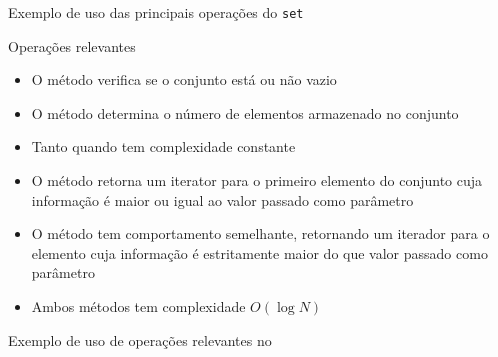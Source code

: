 \begin{frame}[fragile]{Exemplo de uso das principais operações do \texttt{set}}
\end{frame}

\begin{frame}[fragile]{Operações relevantes}

    \begin{itemize}
        \item O método  verifica se o conjunto está ou não vazio

        \item O método  determina o número de elementos armazenado no conjunto

        \item Tanto  quando  tem complexidade constante

        \item O método  retorna um iterator para o primeiro elemento do
            conjunto cuja informação é maior ou igual ao valor passado como parâmetro

        \item O método  tem comportamento semelhante, retornando um iterador
            para o elemento cuja informação é estritamente maior do que valor passado como parâmetro

        \item Ambos métodos tem complexidade $O(\log N)$
    \end{itemize}

\end{frame}

\begin{frame}[fragile]{Exemplo de uso de operações relevantes no }
\end{frame}

